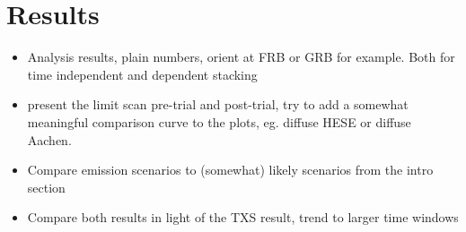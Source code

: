 \chapter{Results}

\begin{itemize}
  \item Analysis results, plain numbers, orient at FRB or GRB for example.
  Both for time independent and dependent stacking
  \item present the limit scan pre-trial and post-trial, try to add a somewhat meaningful comparison curve to the plots, eg. diffuse HESE or diffuse Aachen.
  \item Compare emission scenarios to (somewhat) likely scenarios from the intro section
  \item Compare both results in light of the TXS result, trend to larger time windows
\end{itemize}